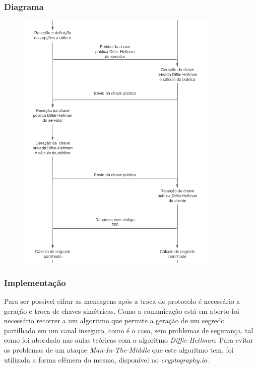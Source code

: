 \documentclass[10pt,english]{article}
\begin{document}
\subsubsection{Diagrama}
\vspace*{1cm}
    \begin{figure}[!h]
            \centering
            \includegraphics[width=375]{images/2.png}
    \end{figure}

\subsubsection{Implementação}

\par Para ser possível cifrar as mensagens após a troca do protocolo é necessário a geração e troca de chaves simétricas. Como a comunicação está em aberto foi necessário recorrer a um algoritmo que permite a geração de um segredo partilhado em um canal inseguro, como é o caso, sem problemas de segurança, tal como foi abordado nas aulas teóricas com o algoritmo \textit{Diffie-Hellman}. Para evitar os problemas de um ataque \textit{Man-In-The-Middle} que este algoritmo tem, foi utilizada a forma efêmera do mesmo, disponível no \textit{cryptography.io}.
\end{document}
